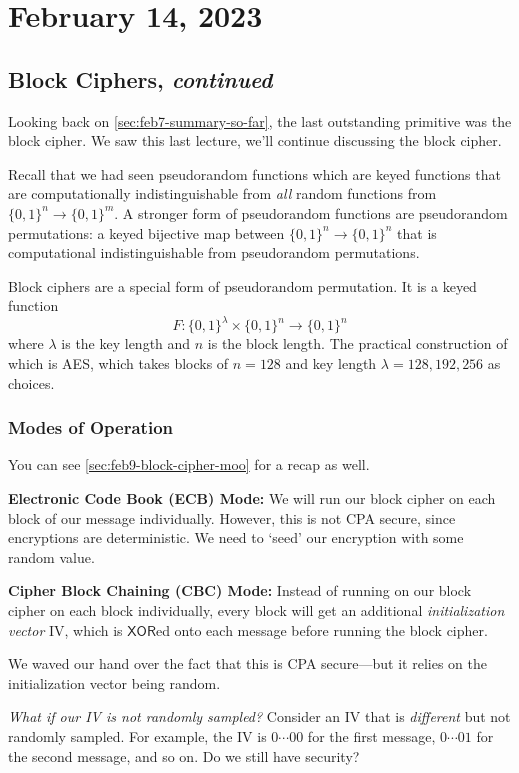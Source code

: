 \section{February 14, 2023}
\label{20230214}
\subsection{Block Ciphers, \emph{continued}}
Looking back on \cref{sec:feb7-summary-so-far}, the last outstanding primitive was the block cipher. We saw this last lecture, we'll continue discussing the block cipher.

Recall that we had seen pseudorandom functions which are keyed functions that are computationally indistinguishable from \emph{all} random functions from $\{0, 1\}^n\to \{0, 1\}^m$. A stronger form of pseudorandom functions are pseudorandom permutations: a keyed bijective map between $\{0, 1\}^n\to \{0, 1\}^n$ that is computational indistinguishable from pseudorandom permutations.

Block ciphers are a special form of pseudorandom permutation. It is a keyed function
\[F : \{0, 1\}^\lambda\times \{0, 1\}^n\to \{0, 1\}^n\]
where $\lambda$ is the key length and $n$ is the block length. The practical construction of which is AES, which takes blocks of $n = 128$ and key length $\lambda = 128, 192, 256$ as choices.

\subsubsection{Modes of Operation}

You can see \cref{sec:feb9-block-cipher-moo} for a recap as well.

\textbf{Electronic Code Book (ECB) Mode:} We will run our block cipher on each block of our message individually. However, this is not CPA secure, since encryptions are deterministic. We need to `seed' our encryption with some random value.

\textbf{Cipher Block Chaining (CBC) Mode:} Instead of running on our block cipher on each block individually, every block will get an additional \emph{initialization vector} IV, which is $\mathsf{XOR}$ed onto each message before running the block cipher.


We waved our hand over the fact that this is CPA secure---but it relies on the initialization vector being random.

\emph{What if our IV is not randomly sampled?} Consider an IV that is \emph{different} but not randomly sampled. For example, the IV is $0\cdots 00$ for the first message, $0\cdots 01$ for the second message, and so on. Do we still have security?

